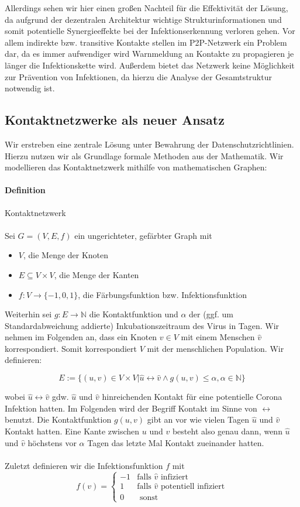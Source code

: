 \documentclass[12pt]{article}
\begin{document}
Allerdings sehen wir hier einen großen Nachteil für die Effektivität der Lösung, da
aufgrund der dezentralen Architektur wichtige Strukturinformationen und somit potentielle Synergieeffekte bei der Infektionserkennung verloren gehen. Vor allem indirekte bzw. transitive Kontakte stellen im P2P-Netzwerk ein Problem dar, da es immer aufwendiger wird Warnmeldung an Kontakte zu propagieren je länger die Infektionskette wird. Außerdem bietet das Netzwerk keine Möglichkeit zur Prävention von Infektionen, da hierzu die Analyse der Gesamtstruktur notwendig ist.

\subsection{Kontaktnetzwerke als neuer Ansatz} 
Wir erstreben eine zentrale Lösung unter Bewahrung der Datenschutzrichtlinien.
Hierzu nutzen wir als Grundlage formale Methoden aus der Mathematik. Wir
modellieren das Kontaktnetzwerk mithilfe von mathematischen Graphen:

\paragraph{Definition} Kontaktnetzwerk \\ \\
Sei $G=(V,E,f)$ ein ungerichteter, gefärbter Graph mit
\begin{itemize}
	\item $V$, die Menge der Knoten
	\item $E \subseteq V \times V$, die Menge der Kanten
	\item $f: V \to \{-1,0,1\}$, die Färbungsfunktion bzw. Infektionsfunktion \\
\end{itemize} 

Weiterhin sei $g: E \to \mathbb{N}$ die Kontaktfunktion und $\alpha$ der (ggf. um Standardabweichung addierte) Inkubationszeitraum des Virus in Tagen. Wir nehmen im Folgenden an, dass ein Knoten $v \in V$ mit einem Menschen $\hat{v}$ korrespondiert. Somit korrespondiert $V$ mit der menschlichen Population. Wir definieren:

\[E := \{(u,v) \in V \times V | \hat{u} \leftrightarrow \hat{v} \land g(u,v) \le \alpha, \alpha \in \mathbb{N}\}\]

wobei $\hat{u} \leftrightarrow \hat{v}$ gdw. $\hat{u}$ und $\hat{v}$ hinreichenden Kontakt für eine potentielle Corona Infektion hatten. Im Folgenden wird der Begriff Kontakt im Sinne von $\leftrightarrow$ benutzt. Die Kontaktfunktion $g(u,v)$ gibt an vor wie vielen Tagen $\hat{u}$ und $\hat{v}$ Kontakt hatten. Eine Kante zwischen $u$ und $v$ besteht also genau dann, wenn $\hat{u}$ und $\hat{v}$ höchstens vor $\alpha$ Tagen das letzte Mal Kontakt zueinander hatten. 
\\\\
Zuletzt definieren wir die Infektionsfunktion $f$ mit
\[
	f(v) = 
	\begin{cases} 
		-1 &\mbox{falls } \hat{v} \text{ infiziert}\\ 
		1 &\mbox{falls }  \hat{v} \text{ potentiell infiziert}\\ 
		0 & \text{ sonst} 
	\end{cases} 
\]
\end{document}
